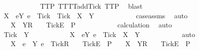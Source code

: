 \begin{isabellebody}
\ \ \ \ \ \ \ \ \ \ \isamarkupfalse%
\ TT{}{\isacharunderscore}P\ TT{}{\isacharunderscore}TT{}{\isacharunderscore}add{\isacharunderscore}Tick\ TT{}{\isacharunderscore}P\ \isamarkupfalse%
\ blast\isanewline
\ \ \ \ \ \ \ \ \isamarkupfalse%
\ \isamarkupfalse%
\ {\isachardoublequoteopen}X\ {\isasymunion}\ {\isacharbraceleft}e{\isasymin}Y{\isachardot}\ e\ {\isasymnoteq}\ Tick{\isacharbraceright}\ {\isasymunion}\ {\isacharbraceleft}Tick{\isacharbraceright}\ {\isacharequal}\ X\ {\isasymunion}\ Y{\isachardoublequoteclose}\isanewline
\ \ \ \ \ \ \ \ \ \ \isamarkupfalse%
\ case{\isacharunderscore}assms{}{\isacharparenleft}{}{\isacharparenright}\ \isamarkupfalse%
\ auto\isanewline
\ \ \ \ \ \ \ \ \isamarkupfalse%
\ \isamarkupfalse%
\ {\isachardoublequoteopen}{\isasymrho}\ {\isacharat}\ {\isacharbrackleft}X\ {\isasymunion}\ Y{\isacharbrackright}\isactrlsub R\ {\isacharhash}\ {\isasymsigma}{}\ {\isacharat}\ {\isacharbrackleft}{\isacharbrackleft}Tick{\isacharbrackright}\isactrlsub E{\isacharbrackright}\ {\isasymin}\ P{\isachardoublequoteclose}\isanewline
\ \ \ \ \ \ \ \ \ \ \isamarkupfalse%
\ calculation\ \isamarkupfalse%
\ auto\isanewline
\ \ \ \ \ \ \isamarkupfalse%
\isanewline
\ \ \ \ \ \ \ \ \isamarkupfalse%
\ {\isachardoublequoteopen}Tick\ {\isasymnotin}\ Y{\isachardoublequoteclose}\isanewline
\ \ \ \ \ \ \ \ \isamarkupfalse%
\ \isamarkupfalse%
\ {\isachardoublequoteopen}X\ {\isasymunion}\ {\isacharbraceleft}e{\isasymin}Y{\isachardot}\ e\ {\isasymnoteq}\ Tick{\isacharbraceright}\ {\isacharequal}\ X\ {\isasymunion}\ Y{\isachardoublequoteclose}\isanewline
\ \ \ \ \ \ \ \ \ \ \isamarkupfalse%
\ auto\isanewline
\ \ \ \ \ \ \ \ \isamarkupfalse%
\ \isamarkupfalse%
\ {\isachardoublequoteopen}{\isasymrho}\ {\isacharat}\ {\isacharbrackleft}X\ {\isasymunion}\ {\isacharbraceleft}e\ {\isasymin}\ Y{\isachardot}\ e\ {\isasymnoteq}\ Tick{\isacharbraceright}{\isacharbrackright}\isactrlsub R\ {\isacharhash}\ {\isasymsigma}{}\ {\isacharat}\ {\isacharbrackleft}{\isacharbrackleft}Tick{\isacharbrackright}\isactrlsub E{\isacharbrackright}\ {\isasymin}\ P\ {\isasymLongrightarrow}\ {\isasymrho}\ {\isacharat}\ {\isacharbrackleft}X\ {\isasymunion}\ Y{\isacharbrackright}\isactrlsub R\ {\isacharhash}\ {\isasymsigma}{}\ {\isacharat}\ {\isacharbrackleft}{\isacharbrackleft}Tick{\isacharbrackright}\isactrlsub E{\isacharbrackright}\ {\isasymin}\ P{\isachardoublequoteclose}\isanewline

\end{isabellebody}
